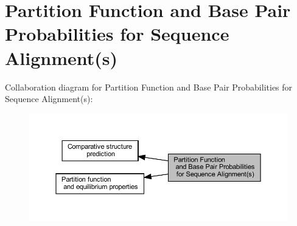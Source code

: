 \hypertarget{group__consensus__pf__fold}{}\section{Partition Function and Base Pair Probabilities for Sequence Alignment(s)}
\label{group__consensus__pf__fold}
Collaboration diagram for Partition Function and Base Pair Probabilities for Sequence Alignment(s)\+:
\nopagebreak
\begin{figure}[H]
\begin{center}
\leavevmode
\includegraphics[width=350pt]{group__consensus__pf__fold}
\end{center}
\end{figure}
